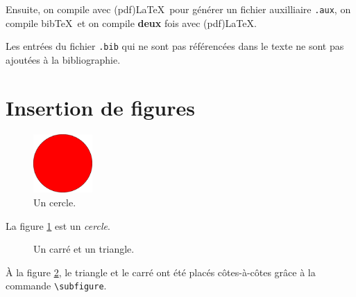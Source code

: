 \documentclass[12pt,twoside,maitrise]{dms}
\theoremstyle{definition}
\numberwithin{equation}{section}
\numberwithin{table}{chapter}
\numberwithin{figure}{chapter}
\begin{document}
Ensuite, on compile avec (pdf)\LaTeX\ pour générer un fichier auxilliaire
\texttt{.aux}, on compile bib\TeX\ et on compile \textbf{deux} fois
avec (pdf)\LaTeX.

Les entrées du fichier \verb|.bib| qui ne sont pas référencées
dans le texte ne sont pas ajoutées à la bibliographie.

\section{Insertion de figures}


\begin{figure}[t]
    \centering
    \includegraphics[width=0.2\textwidth]{figures/cercle.pdf}
    \caption{Un cercle.}
    \label{fig:Cercle}
\end{figure}
La figure \ref{fig:Cercle} est un \emph{cercle}.
\begin{figure}[t]
    \centering
    \hspace{2cm}
    \caption{\label{fig:TriCar}Un carré et un triangle.}
\end{figure}
À la figure \ref{fig:TriCar}, le triangle  et le carré  ont été placés côtes-à-côtes grâce à la commande \verb|\subfigure|.


\end{document}
